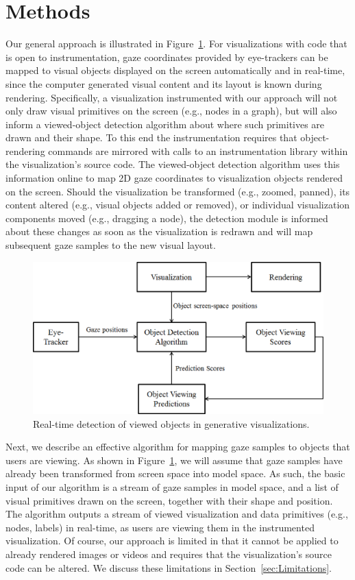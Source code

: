 ﻿\section{Methods}\label{sec:Methods}

Our general approach is illustrated in Figure~\ref{fig:systemBlockDiagram}. For visualizations with code that is open to instrumentation, gaze coordinates provided by eye-trackers can be mapped to visual objects displayed on the screen automatically and in real-time, since the computer generated visual content and its layout is known during rendering.  Specifically, a visualization instrumented with our approach will not only draw visual primitives on the screen (e.g., nodes in a graph), but will also inform a viewed-object detection algorithm about where such primitives are drawn and their shape. To this end the instrumentation requires that object-rendering commands are mirrored with calls to an instrumentation library within the visualization's source code. The viewed-object detection algorithm uses this information online to map 2D gaze coordinates to visualization objects rendered on the screen. Should the visualization be transformed (e.g., zoomed, panned), its content altered (e.g., visual objects added or removed), or individual visualization components moved (e.g., dragging a node), the detection module is informed about these changes as soon as the visualization is redrawn and will map subsequent gaze samples to the new visual layout. 

\begin{figure}[htb]
  \centering
  \includegraphics[width=0.75\linewidth]{images/systemBlockDiagram.eps}
  \caption{Real-time detection of viewed objects in generative visualizations.}
	\label{fig:systemBlockDiagram}
\end{figure}

Next, we describe an effective algorithm for mapping gaze samples to objects that users are viewing. As shown in Figure~\ref{fig:systemBlockDiagram}, we will assume that gaze samples have already been transformed from screen space into model space. As such, the basic input of our algorithm is a stream of gaze samples in model space, and a list of visual primitives drawn on the screen, together with their shape and position. The algorithm outputs a stream of viewed visualization and data primitives (e.g., nodes, labels) in real-time, as users are viewing them in the instrumented visualization. Of course, our approach is limited in that it cannot be applied to already rendered images or videos and requires that the visualization's source code can be altered. We discuss these limitations in Section~\ref{sec:Limitations}.

